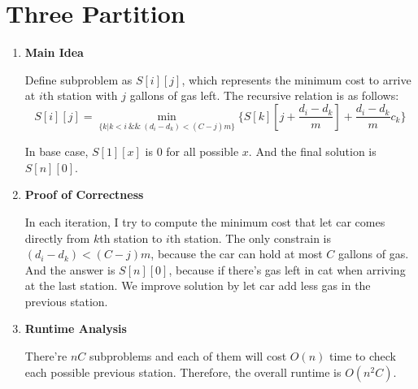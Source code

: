 \documentclass[11pt]{article}
\newenvironment{qparts}{\begin{enumerate}[{(}a{)}]}{\end{enumerate}}
\begin{document}
\newpage
\section{Three Partition}
\begin{qparts}
	\item \textbf{Main Idea}
	
	Define subproblem as $S[i][j]$, which represents the minimum cost to arrive at $i$th station with $j$ gallons of gas left.
	The recursive relation is as follows:
	\[
		S[i][j] = \min_{\{ k | k < i \  \&\& \  (d_i - d_k) < (C - j)m \}} \{ S[k][j + \frac{d_i - d_k}{m}] + \frac{d_i - d_k}{m} c_k \}
	\]
	
	In base case, $S[1][x]$ is 0 for all possible $x$. And the final solution is $S[n][0]$.

	\item \textbf{Proof of Correctness}
	
	In each iteration, I try to compute the minimum cost that let car comes directly from $k$th station to $i$th station. The only constrain is $(d_i - d_k) < (C - j)m$, because the car can hold at most $C$ gallons of gas. And the answer is $S[n][0]$, because if there's gas left in cat when arriving at the last station. We improve solution by let car add less gas in the previous station.
	
	\item \textbf{Runtime Analysis}
	
	There're $nC$ subproblems and each of them will cost $O(n)$ time to check each possible previous station. Therefore, the overall runtime is $O(n^2C)$.
	

\end{qparts}

\newpage
\end{document}
